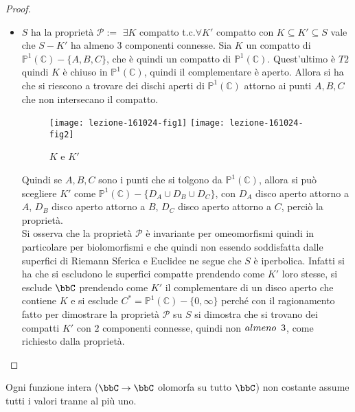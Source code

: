 \begin{proof}
\begin{itemize}
\item $S$ ha la proprietà $\mathcal{P}:= $ $\exists K$ compatto t.c.$\forall K'$ compatto con $K\subseteq K'\subseteq S$ vale che $S\minus K'$ ha almeno $3$ componenti connesse.
Sia $K$ un compatto di $\mathbb{P}^1(\mathbb{C})\minus\{ A, B, C\}$, che è quindi un compatto di $\mathbb{P}^1(\mathbb{C})$. Quest'ultimo è $T2$ quindi $K$ è chiuso in $\mathbb{P}^1(\mathbb{C})$, quindi il complementare è aperto. Allora si ha che si riescono a trovare dei dischi aperti di $\mathbb{P}^1(\mathbb{C})$ attorno ai punti $A, B, C$ che non intersecano il compatto.

\begin{figure}[h]
\texttt{[image: lezione-161024-fig1]}
\texttt{[image: lezione-161024-fig2]}
\caption{$K$ e $K'$}\label{fig:1}
\end{figure}

Quindi se $A, B, C$ sono i punti che si tolgono da $\mathbb{P}^1(\mathbb{C})$, allora si può scegliere $K'$ come $\mathbb{P}^1(\mathbb{C})\minus\{D_A\cup D_B\cup D_C\}$, con $D_A$ disco aperto attorno a $A$, $D_B$ disco aperto attorno a $B$, $D_C$ disco aperto attorno a $C$, perciò la proprietà.\\
Si osserva che la proprietà $\mathcal{P}$ è invariante per omeomorfismi quindi in particolare per biolomorfismi e che quindi non essendo soddisfatta dalle superfici di Riemann Sferica e Euclidee ne segue che $S$ è iperbolica.
Infatti si ha che si escludono le superfici compatte prendendo come $K'$ loro stesse, si esclude $\bbC$ prendendo come $K'$ il complementare di un disco aperto che contiene $K$ e si esclude $C^*=\mathbb{P}^1(\mathbb{C})\minus\{ 0,\infty\}$ perché con il ragionamento fatto per dimostrare la proprietà $\mathcal{P}$ su $S$ si dimostra che si trovano dei compatti $K'$ con $2$ componenti connesse, quindi non $almeno\hskip0.5em\relax 3$, come richiesto dalla proprietà.
\end{itemize}
\end{proof}


\begin{teorema}
Ogni funzione intera ($\bbC\rightarrow\bbC$ olomorfa su tutto $\bbC$) non costante assume tutti i valori tranne al più uno.
\end{teorema}

